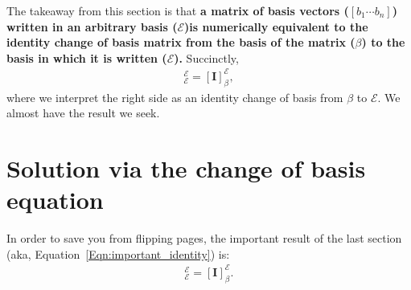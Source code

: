 \documentclass[11pt]{article}
\begin{document}
The takeaway from this section is that \textbf{a matrix of basis
  vectors ($[b_1 \cdots b_n]$) written in an arbitrary basis
  ($\mathcal{E}$)is numerically equivalent to the identity change of
  basis matrix from the basis of the matrix ($\beta$) to the basis in
  which it is written ($\mathcal{E}$).}  Succinctly,
\begin{align}
  [\beta]^\mathcal{E}_\mathcal{E} = [\textbf{I}]^\mathcal{E}_\beta,
  \label{Eqn:important_identity}
\end{align}
where we interpret the right side as an identity change of basis from
$\beta$ to $\mathcal{E}$.  We almost have the result we seek.

\newpage
\section{Solution via the change of basis equation}

In order to save you from flipping pages, the important result of the
last section (aka, Equation~\ref{Eqn:important_identity}) is:
\begin{align*}
  [\beta]^\mathcal{E}_\mathcal{E} = [\textbf{I}]^\mathcal{E}_\beta.
\end{align*}
\end{document}
